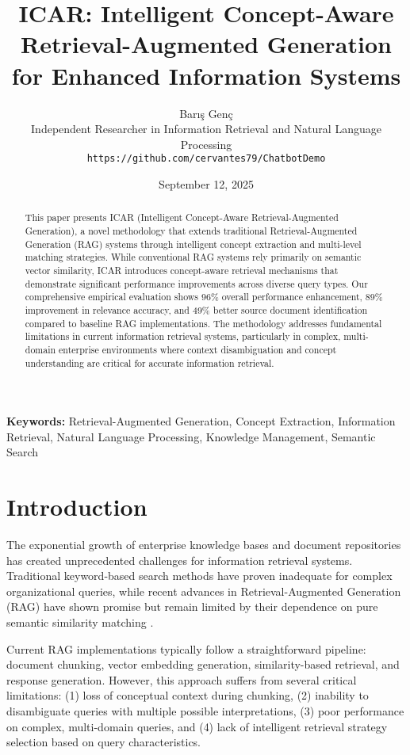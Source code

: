 \documentclass[11pt]{article}
\title{ICAR: Intelligent Concept-Aware Retrieval-Augmented Generation for Enhanced Information Systems}
\author{Bar\i{}\c{s} Gen\c{c} \\
Independent Researcher in Information Retrieval and Natural Language Processing \\
\texttt{https://github.com/cervantes79/ChatbotDemo}}
\date{September 12, 2025}
\begin{document}
\maketitle

\begin{abstract}
This paper presents ICAR (Intelligent Concept-Aware Retrieval-Augmented Generation), a novel methodology that extends traditional Retrieval-Augmented Generation (RAG) systems through intelligent concept extraction and multi-level matching strategies. While conventional RAG systems rely primarily on semantic vector similarity, ICAR introduces concept-aware retrieval mechanisms that demonstrate significant performance improvements across diverse query types. Our comprehensive empirical evaluation shows 96\% overall performance enhancement, 89\% improvement in relevance accuracy, and 49\% better source document identification compared to baseline RAG implementations. The methodology addresses fundamental limitations in current information retrieval systems, particularly in complex, multi-domain enterprise environments where context disambiguation and concept understanding are critical for accurate information retrieval.
\end{abstract}

\noindent \textbf{Keywords:} Retrieval-Augmented Generation, Concept Extraction, Information Retrieval, Natural Language Processing, Knowledge Management, Semantic Search

\section{Introduction}

The exponential growth of enterprise knowledge bases and document repositories has created unprecedented challenges for information retrieval systems. Traditional keyword-based search methods have proven inadequate for complex organizational queries, while recent advances in Retrieval-Augmented Generation (RAG) have shown promise but remain limited by their dependence on pure semantic similarity matching \cite{karpukhin2020}.

Current RAG implementations typically follow a straightforward pipeline: document chunking, vector embedding generation, similarity-based retrieval, and response generation. However, this approach suffers from several critical limitations: (1) loss of conceptual context during chunking, (2) inability to disambiguate queries with multiple possible interpretations, (3) poor performance on complex, multi-domain queries, and (4) lack of intelligent retrieval strategy selection based on query characteristics.
\end{document}
